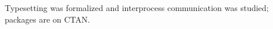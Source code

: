 \documentclass[11pt]{article}\usepackage[paperwidth=14cm,paperheight=11cm,margin=1cm]{geometry}\pagestyle{empty}
\begin{document}
Typesetting was formalized\autocite{knuth1984} and interprocess communication was studied\autocite{lamport1986}; packages are on CTAN\autocite{ctan}.
\printbibliography[heading=none]
\end{document}
